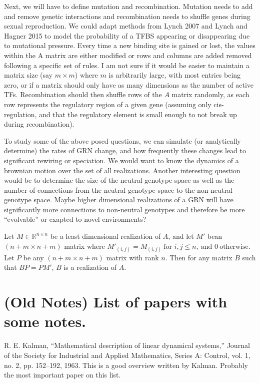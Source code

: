 \documentclass[11 pt]{article}
\begin{document}
Next, we will have to define mutation and recombination. Mutation needs to add
and remove genetic interactions and recombination needs to shuffle genes during
sexual reproduction. We could adapt methods from Lynch 2007 and Lynch and
Hagner 2015 to model the probability of a TFBS appearing or disappearing due to
mutational pressure. Every time a new binding site is gained or lost, the
values within the A matrix are either modified or rows and columns are added
removed following a specific set of rules. I am not sure if it would be easier
to maintain a matrix size (say $m \times m$) where $m$ is arbitrarily large,
with  most entries being zero, or if a matrix should only have as many
dimensions as the number of active TFs. Recombination should then shuffle rows
of the $A$ matrix randomly, as each row represents the regulatory region of a
given gene (assuming only cis-regulation, and that the regulatory element is
small enough to not break up during recombination).  

To study some of the above posed questions, we can simulate (or analytically
determine) the rates of GRN change, and how frequently these changes lead to
significant rewiring or speciation. We would want to know the dynamics of a
brownian motion over the set of all realizations.  Another interesting question
would be to determine the size of the neutral genotype space as well as the
number of connections from the neutral genotype space to the non-neutral
genotype space. Maybe higher dimensional realizations of a GRN will have
significantly more connections to non-neutral genotypes and therefore be more
``evolvable'' or exapted to novel environments? 

Let $M \in \mathbb{R}^{n \times n}$ be a least dimensional realization of $A$,
and let $M'$ bean $(n+m \times n+m)$ matrix where $M'_{(i,j)} = M_{(i,j)} \
\text{for } i,j \leq n, \ \text{and } 0 \ \text{otherwise}$. Let $P$ be any
$(n+m \times n+m)$ matrix with rank $n$. Then for any matrix $B$ such that $BP
= PM'$, $B$ is a realization of $A$.     

\section{(Old Notes) List of papers with some notes.}

R. E. Kalman, “Mathematical description of linear dynamical systems,” Journal of the Society for Industrial and Applied Mathematics, Series A: Control, vol. 1, no. 2, pp. 152–192, 1963.
This is a good overview written by Kalman. Probably the most important paper on this list.
\end{document}

